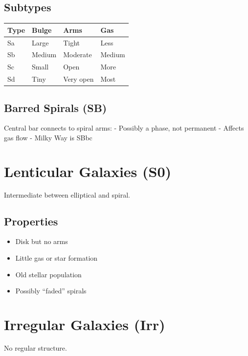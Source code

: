\documentclass[
  11pt,
  letterpaper,
  twoside,
  openright]{book}
\providecommand{\tightlist}{%
  \setlength{\itemsep}{0pt}\setlength{\parskip}{0pt}}
\begin{document}
\subsection{Subtypes}\label{subtypes}

\begin{longtable}[]{@{}llll@{}}
\toprule\noalign{}
Type & Bulge & Arms & Gas \\
\midrule\noalign{}
\endhead
\bottomrule\noalign{}
\endlastfoot
Sa & Large & Tight & Less \\
Sb & Medium & Moderate & Medium \\
Sc & Small & Open & More \\
Sd & Tiny & Very open & Most \\
\end{longtable}

\subsection{Barred Spirals (SB)}\label{barred-spirals-sb}

Central bar connects to spiral arms: - Possibly a phase, not permanent -
Affects gas flow - Milky Way is SBbc

\section{Lenticular Galaxies (S0)}\label{lenticular-galaxies-s0}

Intermediate between elliptical and spiral.

\subsection{Properties}\label{properties-15}

\begin{itemize}
\tightlist
\item
  Disk but no arms
\item
  Little gas or star formation
\item
  Old stellar population
\item
  Possibly ``faded'' spirals
\end{itemize}

\section{Irregular Galaxies (Irr)}\label{irregular-galaxies-irr}

No regular structure.
\end{document}
